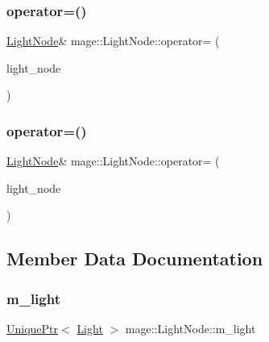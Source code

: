 \subsubsection{\texorpdfstring{operator=()}{operator=()}\hspace{0.1cm}{\footnotesize\ttfamily [1/2]}}
{\footnotesize\ttfamily \hyperlink{classmage_1_1_light_node}{Light\+Node}\& mage\+::\+Light\+Node\+::operator= (\begin{DoxyParamCaption}\item[{const \hyperlink{classmage_1_1_light_node}{Light\+Node} \&}]{light\+\_\+node }\end{DoxyParamCaption})\hspace{0.3cm}{\ttfamily [delete]}}

\hypertarget{classmage_1_1_light_node_abda92f7cf2ce3aed3af94d2278e2bfa1}{}\label{classmage_1_1_light_node_abda92f7cf2ce3aed3af94d2278e2bfa1} 
\subsubsection{\texorpdfstring{operator=()}{operator=()}\hspace{0.1cm}{\footnotesize\ttfamily [2/2]}}
{\footnotesize\ttfamily \hyperlink{classmage_1_1_light_node}{Light\+Node}\& mage\+::\+Light\+Node\+::operator= (\begin{DoxyParamCaption}\item[{\hyperlink{classmage_1_1_light_node}{Light\+Node} \&\&}]{light\+\_\+node }\end{DoxyParamCaption})\hspace{0.3cm}{\ttfamily [delete]}}



\subsection{Member Data Documentation}
\hypertarget{classmage_1_1_light_node_aad97d01d2adb66eac0e93bdcdb919a05}{}\label{classmage_1_1_light_node_aad97d01d2adb66eac0e93bdcdb919a05} 
\subsubsection{\texorpdfstring{m\+\_\+light}{m\_light}}
{\footnotesize\ttfamily \hyperlink{namespacemage_a8c307fbcc33bce9b7f2aa4c26c3b95cf}{Unique\+Ptr}$<$ \hyperlink{classmage_1_1_light}{Light} $>$ mage\+::\+Light\+Node\+::m\+\_\+light\hspace{0.3cm}{\ttfamily [private]}}

